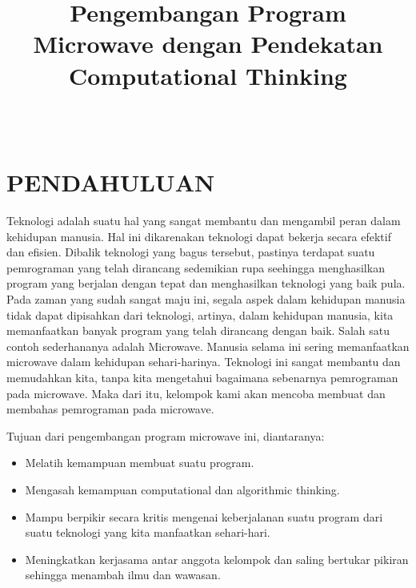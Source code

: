 \documentclass[conference]{IEEEtran}
\begin{document}
\title{Pengembangan Program Microwave dengan Pendekatan Computational Thinking
}

\author{
\\
}
\maketitle

\section{PENDAHULUAN}
Teknologi adalah suatu hal yang sangat membantu dan mengambil peran dalam kehidupan manusia. Hal ini dikarenakan teknologi dapat bekerja secara efektif dan efisien.
Dibalik teknologi yang bagus tersebut, pastinya terdapat suatu pemrograman yang telah dirancang sedemikian rupa seehingga menghasilkan program yang berjalan dengan tepat dan menghasilkan teknologi
yang baik pula. Pada zaman yang sudah sangat maju ini, segala aspek dalam kehidupan manusia tidak dapat 
dipisahkan dari teknologi, artinya, dalam kehidupan manusia, kita memanfaatkan banyak program yang telah dirancang dengan baik. Salah satu contoh sederhananya adalah Microwave.
Manusia selama ini sering memanfaatkan microwave dalam kehidupan sehari-harinya. Teknologi ini sangat membantu dan memudahkan kita, tanpa kita mengetahui bagaimana sebenarnya pemrograman pada microwave.
Maka dari itu, kelompok kami akan mencoba membuat dan membahas pemrograman pada microwave.

Tujuan dari pengembangan program microwave ini, diantaranya:
\begin{itemize}
    \item Melatih kemampuan membuat suatu program.
    \item Mengasah kemampuan computational dan algorithmic thinking.
    \item Mampu berpikir secara kritis mengenai keberjalanan suatu program dari suatu teknologi yang kita manfaatkan sehari-hari.
    \item Meningkatkan kerjasama antar anggota kelompok dan saling bertukar pikiran sehingga menambah ilmu dan wawasan.
\end{itemize}
\end{document}
